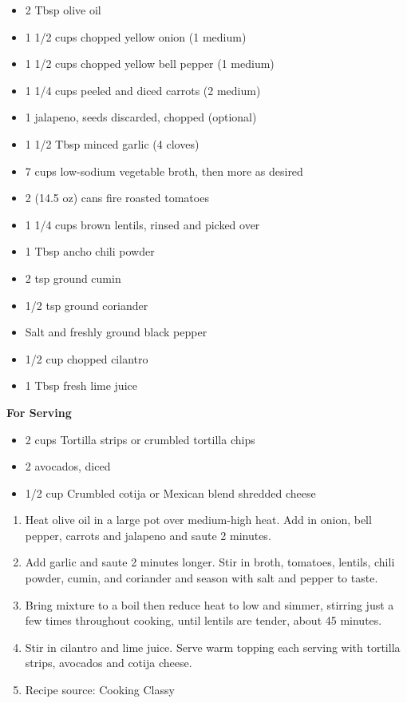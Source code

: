 
\ingredients
\begin{itemize}
	\item 2 Tbsp olive oil
	\item 1 1/2 cups chopped yellow onion (1 medium)
	\item 1 1/2 cups chopped yellow bell pepper (1 medium)
	\item 1 1/4 cups peeled and diced carrots (2 medium)
	\item 1 jalapeno, seeds discarded, chopped (optional)
	\item 1 1/2 Tbsp minced garlic (4 cloves)
	\item 7 cups low-sodium vegetable broth, then more as desired
	\item 2 (14.5 oz) cans fire roasted tomatoes
	\item 1 1/4 cups brown lentils, rinsed and picked over
	\item 1 Tbsp ancho chili powder
	\item 2 tsp ground cumin
	\item 1/2 tsp ground coriander
	\item Salt and freshly ground black pepper
	\item 1/2 cup chopped cilantro
	\item 1 Tbsp fresh lime juice
\end{itemize}

\textbf{For Serving}
\begin{itemize}
	\item 2 cups Tortilla strips or crumbled tortilla chips
	\item 2 avocados, diced
	\item 1/2 cup Crumbled cotija or Mexican blend shredded cheese
\end{itemize}

\instructions
\begin{enumerate}
	\item Heat olive oil in a large pot over medium-high heat. Add in onion, bell pepper, carrots and jalapeno and saute 2 minutes.
    \item Add garlic and saute 2 minutes longer. Stir in broth, tomatoes, lentils, chili powder, cumin, and coriander and season with salt and pepper to taste.
    \item Bring mixture to a boil then reduce heat to low and simmer, stirring just a few times throughout cooking, until lentils are tender, about 45 minutes.
    \item Stir in cilantro and lime juice. Serve warm topping each serving with tortilla strips, avocados and cotija cheese.
    \item Recipe source: Cooking Classy
\end{enumerate}
